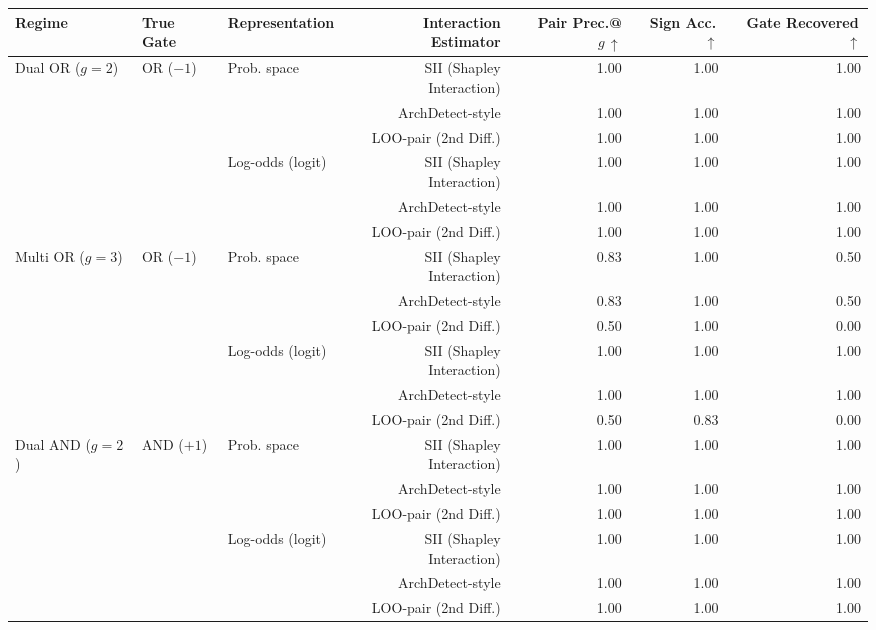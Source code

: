\begin{tabular}{lllrrrr}
\toprule
Regime & True Gate & Representation & Interaction Estimator & Pair Prec.@$g\,\uparrow$ & Sign Acc.\,$\uparrow$ & Gate Recovered\,$\uparrow$ \\
\midrule
Dual OR ($g{=}2$) & OR ($-1$) & Prob. space & SII (Shapley Interaction) & 1.00 & 1.00 & 1.00 \\
 &  &  & ArchDetect-style & 1.00 & 1.00 & 1.00 \\
 &  &  & LOO-pair (2nd Diff.) & 1.00 & 1.00 & 1.00 \\
\cmidrule(lr){3-7}
 &  & Log-odds (logit) & SII (Shapley Interaction) & 1.00 & 1.00 & 1.00 \\
 &  &  & ArchDetect-style & 1.00 & 1.00 & 1.00 \\
 &  &  & LOO-pair (2nd Diff.) & 1.00 & 1.00 & 1.00 \\
\midrule
Multi OR ($g{=}3$) & OR ($-1$) & Prob. space & SII (Shapley Interaction) & 0.83 & 1.00 & 0.50 \\
 &  &  & ArchDetect-style & 0.83 & 1.00 & 0.50 \\
 &  &  & LOO-pair (2nd Diff.) & 0.50 & 1.00 & 0.00 \\
\cmidrule(lr){3-7}
 &  & Log-odds (logit) & SII (Shapley Interaction) & 1.00 & 1.00 & 1.00 \\
 &  &  & ArchDetect-style & 1.00 & 1.00 & 1.00 \\
 &  &  & LOO-pair (2nd Diff.) & 0.50 & 0.83 & 0.00 \\
\midrule
Dual AND ($g{=}2$) & AND ($+1$) & Prob. space & SII (Shapley Interaction) & 1.00 & 1.00 & 1.00 \\
 &  &  & ArchDetect-style & 1.00 & 1.00 & 1.00 \\
 &  &  & LOO-pair (2nd Diff.) & 1.00 & 1.00 & 1.00 \\
\cmidrule(lr){3-7}
 &  & Log-odds (logit) & SII (Shapley Interaction) & 1.00 & 1.00 & 1.00 \\
 &  &  & ArchDetect-style & 1.00 & 1.00 & 1.00 \\
 &  &  & LOO-pair (2nd Diff.) & 1.00 & 1.00 & 1.00 \\
\bottomrule
\end{tabular}
